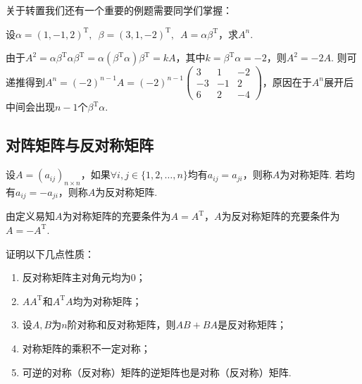 关于转置我们还有一个重要的例题需要同学们掌握：
\begin{example}\label{ex:9:转置求幂}
    设$\alpha=(1,-1,2)^\mathrm{T},\enspace\beta=(3,1,-2)^\mathrm{T},\enspace A=\alpha\beta^\mathrm{T}$，求$A^n$.
\end{example}

\begin{solution}
    由于$A^2=\alpha\beta^\mathrm{T}\alpha\beta^\mathrm{T}=\alpha(\beta^\mathrm{T}\alpha)\beta^\mathrm{T}=kA$，其中$k=\beta^\mathrm{T}\alpha=-2$，则$A^2=-2A$. 则可递推得到$A^n=(-2)^{n-1}A=(-2)^{n-1}\begin{pmatrix}
            3 & 1 & -2 \\ -3 & -1 & 2 \\ 6 & 2 & -4
        \end{pmatrix}$，原因在于$A^n$展开后中间会出现$n-1$个$\beta^\mathrm{T}\alpha$.
\end{solution}

\subsection{对阵矩阵与反对称矩阵}

\begin{definition}
    设$A=(a_{ij})_{n \times n}$，如果$\forall i,j\in\{1,2,\ldots,n\}$均有$a_{ij}=a_{ji}$，则称$A$为对称矩阵. 若均有$a_{ij}=-a_{ji}$，则称$A$为反对称矩阵.
\end{definition}
由定义易知$A$为对称矩阵的充要条件为$A=A^\mathrm{T}$，$A$为反对称矩阵的充要条件为$A=-A^\mathrm{T}$.
\begin{example}
    证明以下几点性质：
    \begin{enumerate}
        \item 反对称矩阵主对角元均为0；

        \item $AA^\mathrm{T}$和$A^\mathrm{T}A$均为对称矩阵；

        \item 设$A,B$为$n$阶对称和反对称矩阵，则$AB+BA$是反对称矩阵；

        \item 对称矩阵的乘积不一定对称；

        \item 可逆的对称（反对称）矩阵的逆矩阵也是对称（反对称）矩阵.
    \end{enumerate}
\end{example}

